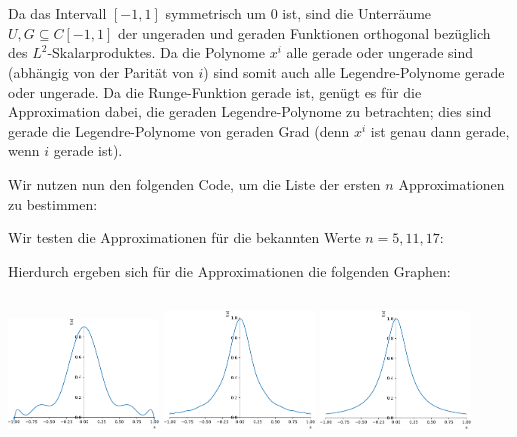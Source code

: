 \section{}

Da das Intervall $[-1,1]$ symmetrisch um $0$ ist, sind die Unterräume $U, G \subseteq C[-1, 1]$ der ungeraden und geraden Funktionen orthogonal bezüglich des $L^2$-Skalarproduktes.
Da die Polynome $x^i$ alle gerade oder ungerade sind (abhängig von der Parität von $i$) sind somit auch alle Legendre-Polynome gerade oder ungerade.
Da die Runge-Funktion gerade ist, genügt es für die Approximation dabei, die geraden Legendre-Polynome zu betrachten;
dies sind gerade die Legendre-Polynome von geraden Grad (denn $x^i$ ist genau dann gerade, wenn $i$ gerade ist).

Wir nutzen nun den folgenden Code, um die Liste der ersten $n$ Approximationen zu bestimmen:



Wir testen die Approximationen für die bekannten Werte $n = 5, 11, 17$:



Hierdurch ergeben sich für die Approximationen die folgenden Graphen:



\subsection{}

\begin{center}
  \includegraphics[width = 0.3\textwidth]{chapter_09/exercise_09_49_figure_1.pdf}
  \hspace{1em}
  \includegraphics[width = 0.3\textwidth]{chapter_09/exercise_09_49_figure_2.pdf}
  \hspace{1em}
  \includegraphics[width = 0.3\textwidth]{chapter_09/exercise_09_49_figure_3.pdf}
\end{center}



